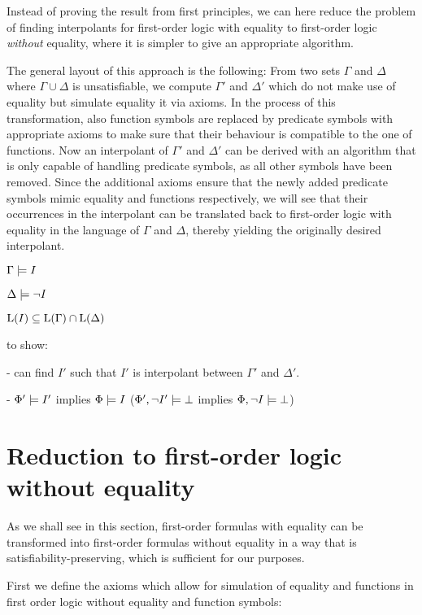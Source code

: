 
Instead of proving the result from first principles, we can here reduce the problem of finding interpolants for first-order logic with equality to first-order logic \emph{without} equality, where it is simpler to give an appropriate algorithm.

The general layout of this approach is the following:
From two sets $\Gamma$ and $\Delta$ where $\Gamma \cup \Delta$ is unsatisfiable, we compute $\Gamma'$ and $\Delta'$ which do not make use of equality but simulate equality it via axioms.
In the process of this transformation, also function symbols are replaced by predicate symbols with appropriate axioms to make sure that their behaviour is compatible to the one of functions.
Now an interpolant of $\Gamma'$ and $\Delta'$ can be derived with an algorithm that is only capable of handling predicate symbols, as all other symbols have been removed.
Since the additional axioms ensure that the newly added predicate symbols mimic equality and functions respectively, we will see that their occurrences in the interpolant can be translated back to first-order logic with equality in the language of $\Gamma$ and $\Delta$, thereby yielding the originally desired interpolant.


$\Gamma \models I$

$\Delta \models \lnot I$

$\mathrm{L}(I) \subseteq \mathrm{L}(\Gamma) \cap \mathrm{L}(\Delta)$

to show:

- can find $I'$ such that $I'$ is interpolant between $\Gamma'$ and $\Delta'$.

- $\Phi' \models I'$ implies $\Phi \models I$ ($\Phi', \lnot I' \models \bot $ implies $\Phi, \lnot I \models \bot$)


\section{Reduction to first-order logic without equality}

As we shall see in this section, first-order formulas with equality can be transformed into first-order formulas without equality in a way that is satisfiability-preserving, which is sufficient for our purposes.

First we define the axioms which allow for simulation of equality and functions in first order logic without equality and function symbols:


